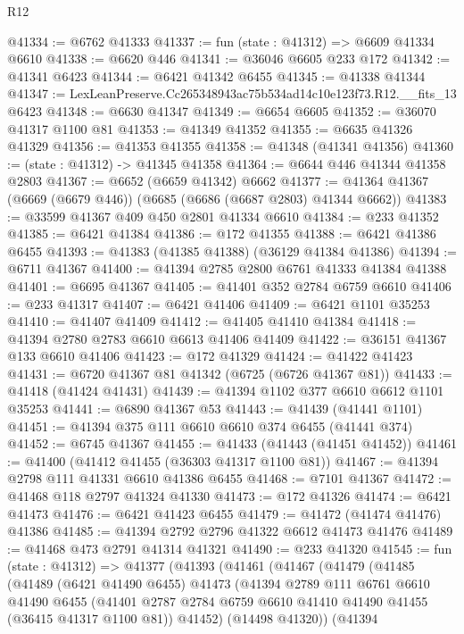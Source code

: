 \begin{lexlean}{R12}
\begin{coremodule}
@41334 := @6762 @41333
@41337 := fun (state : @41312) => @6609 @41334 @6610
@41338 := @6620 @446
@41341 := @36046 @6605 @233 @172
@41342 := @41341 @6423
@41344 := @6421 @41342 @6455
@41345 := @41338 @41344
@41347 := LexLeanPreserve.Cc265348943ac75b534ad14c10e123f73.R12.__fits_13 @6423
@41348 := @6630 @41347
@41349 := @6654 @6605
@41352 := @36070 @41317 @1100 @81
@41353 := @41349 @41352
@41355 := @6635 @41326 @41329
@41356 := @41353 @41355
@41358 := @41348 (@41341 @41356)
@41360 := (state : @41312) -> @41345 @41358
@41364 := @6644 @446 @41344 @41358 @2803
@41367 := @6652 (@6659 @41342) @6662
@41377 := @41364 @41367 (@6669 (@6679 @446)) (@6685 (@6686 (@6687 @2803) @41344 @6662))
@41383 := @33599 @41367 @409 @450 @2801 @41334 @6610
@41384 := @233 @41352
@41385 := @6421 @41384
@41386 := @172 @41355
@41388 := @6421 @41386 @6455
@41393 := @41383 (@41385 @41388) (@36129 @41384 @41386)
@41394 := @6711 @41367
@41400 := @41394 @2785 @2800 @6761 @41333 @41384 @41388
@41401 := @6695 @41367
@41405 := @41401 @352 @2784 @6759 @6610
@41406 := @233 @41317
@41407 := @6421 @41406
@41409 := @6421 @1101 @35253
@41410 := @41407 @41409
@41412 := @41405 @41410 @41384
@41418 := @41394 @2780 @2783 @6610 @6613 @41406 @41409
@41422 := @36151 @41367 @133 @6610 @41406
@41423 := @172 @41329
@41424 := @41422 @41423
@41431 := @6720 @41367 @81 @41342 (@6725 (@6726 @41367 @81))
@41433 := @41418 (@41424 @41431)
@41439 := @41394 @1102 @377 @6610 @6612 @1101 @35253
@41441 := @6890 @41367 @53
@41443 := @41439 (@41441 @1101)
@41451 := @41394 @375 @111 @6610 @6610 @374 @6455 (@41441 @374)
@41452 := @6745 @41367
@41455 := @41433 (@41443 (@41451 @41452))
@41461 := @41400 (@41412 @41455 (@36303 @41317 @1100 @81))
@41467 := @41394 @2798 @111 @41331 @6610 @41386 @6455
@41468 := @7101 @41367
@41472 := @41468 @118 @2797 @41324 @41330
@41473 := @172 @41326
@41474 := @6421 @41473
@41476 := @6421 @41423 @6455
@41479 := @41472 (@41474 @41476) @41386
@41485 := @41394 @2792 @2796 @41322 @6612 @41473 @41476
@41489 := @41468 @473 @2791 @41314 @41321
@41490 := @233 @41320
@41545 := fun (state : @41312) =>
  @41377
    (@41393
      (@41461
        (@41467
          (@41479
            (@41485
              (@41489
                (@6421 @41490 @6455)
                @41473
                (@41394
                  @2789
                  @111
                  @6761
                  @6610
                  @41490
                  @6455
                  (@41401 @2787 @2784 @6759 @6610 @41410 @41490 @41455 (@36415 @41317 @1100 @81))
                  @41452)
                (@14498 @41320))
              (@41394

\end{coremodule}
\end{lexlean}
